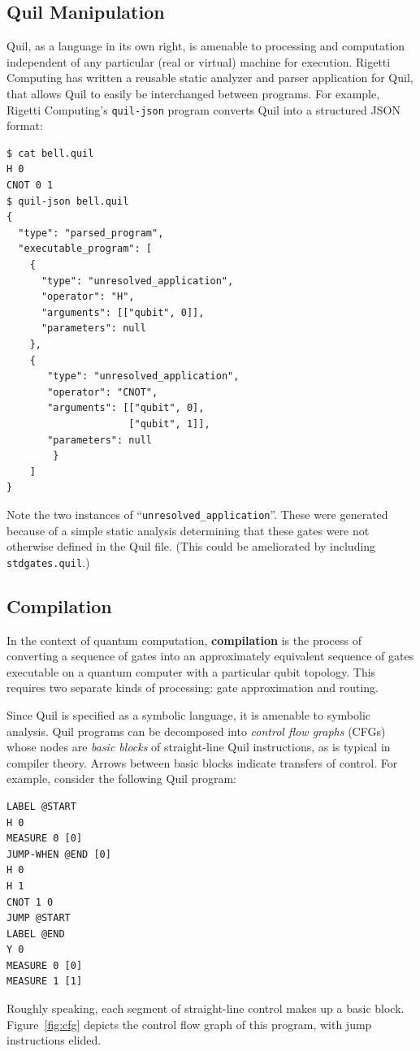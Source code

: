 \documentclass[conference]{IEEEtran}
\newcommand{\defn}[1]{\textbf{#1}}
\begin{document}
\subsection{Quil Manipulation}
Quil, as a language in its own right, is amenable to processing and computation independent of any particular (real or virtual) machine for execution. Rigetti Computing has written a reusable static analyzer and parser application for Quil, that allows Quil to easily be interchanged between programs. For example, Rigetti Computing's \verb|quil-json| program converts Quil into a structured JSON \cite{json} format:
\begin{verbatim}
$ cat bell.quil
H 0
CNOT 0 1
$ quil-json bell.quil
{
  "type": "parsed_program",
  "executable_program": [
    {
      "type": "unresolved_application",
      "operator": "H",
      "arguments": [["qubit", 0]],
      "parameters": null
    },
    {
       "type": "unresolved_application",
       "operator": "CNOT",
       "arguments": [["qubit", 0],
                     ["qubit", 1]],
       "parameters": null
        }
    ]
}
\end{verbatim}
Note the two instances of ``\texttt{unresolved\_application}''. These were generated because of a simple static analysis determining that these gates were not otherwise defined in the Quil file. (This could be ameliorated by including \verb|stdgates.quil|.)

\subsection{Compilation}\label{sec:compilation}
In the context of quantum computation, \defn{compilation} is the process of converting a sequence of gates into an approximately equivalent sequence of gates executable on a quantum computer with a particular qubit topology. This requires two separate kinds of processing: gate approximation and routing.

Since Quil is specified as a symbolic language, it is amenable to symbolic analysis. Quil programs can be decomposed into \emph{control flow graphs} (CFGs) \cite{Allen:1970:CFA:390013.808479} whose nodes are \emph{basic blocks} of straight-line Quil instructions, as is typical in compiler theory. Arrows between basic blocks indicate transfers of control. For example, consider the following Quil program:
\begin{verbatim}
LABEL @START
H 0
MEASURE 0 [0]
JUMP-WHEN @END [0]
H 0
H 1
CNOT 1 0
JUMP @START
LABEL @END
Y 0
MEASURE 0 [0]
MEASURE 1 [1]
\end{verbatim}
Roughly speaking, each segment of straight-line control makes up a basic block. Figure~\ref{fig:cfg} depicts the control flow graph of this program, with jump instructions elided.
\end{document}
